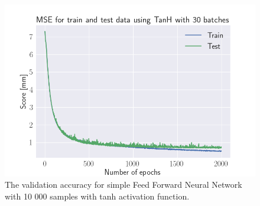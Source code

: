\documentclass[a4paper, UKenglish, 11pt]{uiomaster}
\begin{document}
\begin{figure}[!htb]
    \centering
    \includegraphics[width=\linewidth]{../Code/plots/finals/MSE_**multiple_dipoles_1_noise10_TanH_30_2000.png}
    \caption{The validation accuracy for simple Feed Forward Neural Network with 10 000 samples with tanh activation function. }
    \label{fig:single_dipole_accuracy}
\end{figure}

\end{document}
